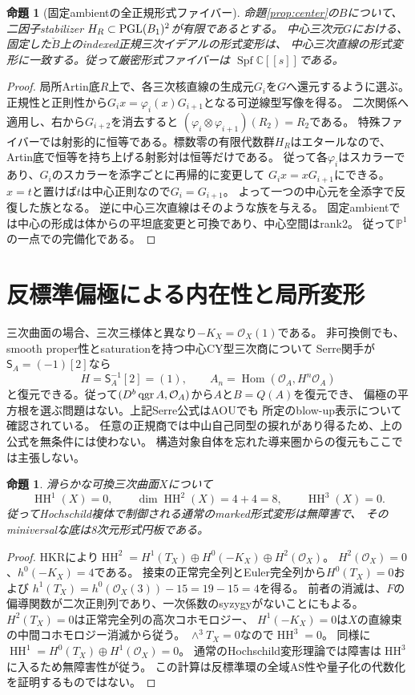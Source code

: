 \documentclass[11pt,a4paper]{ltjsarticle}
\newtheorem{proposition}[theorem]{命題}
\theoremstyle{definition}\newtheorem{remark}[theorem]{注意}
\newcommand{\PP}{\mathbb P}\newcommand{\kk}{\mathbb C}
\newcommand{\Hom}{\operatorname{Hom}}\newcommand{\HH}{\operatorname{HH}}
\newcommand{\OO}{\mathcal O}\newcommand{\rank}{\operatorname{rank}}
\begin{document}
\begin{proposition}[固定ambientの全正規形式ファイバー]\label{prop:normal}
命題\ref{prop:center}の$B$について、二因子stabilizer
$H_R\subset\operatorname{PGL}(B_1)^2$が有限であるとする。
中心三次元$G$における、固定した$\check B$上のindexed正規三次イデアルの形式変形は、
中心三次直線の形式変形に一致する。従って厳密形式ファイバーは
$\operatorname{Spf}\kk[[s]]$である。
\end{proposition}
\begin{proof}
局所Artin底$R$上で、各三次核直線の生成元$G_i$を$G$へ還元するように選ぶ。
正規性と正則性から$G_i x=\varphi_i(x)G_{i+1}$となる可逆線型写像を得る。
二次関係へ適用し、右から$G_{i+2}$を消去すると
$(\varphi_i\otimes\varphi_{i+1})(R_2)=R_2$である。
特殊ファイバーでは射影的に恒等である。標数零の有限代数群$H_R$はエタールなので、
Artin底で恒等を持ち上げる射影対は恒等だけである。
従って各$\varphi_i$はスカラーであり、$G_i$のスカラーを添字ごとに再帰的に変更して
$G_i x=xG_{i+1}$にできる。$x=t$と置けば$t$は中心正則なので$G_i=G_{i+1}$。
よって一つの中心元を全添字で反復した族となる。
逆に中心三次直線はそのような族を与える。
固定ambientでは中心の形成は体からの平坦底変更と可換であり、中心空間はrank2。
従って$\PP^1$の一点での完備化である。
\end{proof}

\section{反標準偏極による内在性と局所変形}
三次曲面の場合、三次三様体と異なり$-K_X=\OO_X(1)$である。
非可換側でも、smooth proper性とsaturationを持つ中心CY型三次商について
Serre関手が$\mathsf S_A=(-1)[2]$なら
\[
 H=\mathsf S_A^{-1}[2]=(1),\qquad
 A_n=\Hom(\OO_A,H^n\OO_A)
\]
と復元できる。従って$(D^b\qgr A,\OO_A)$から$A$と$B=Q(A)$を復元でき、
偏極の平方根を選ぶ問題はない。上記Serre公式はAOU\cite[Lemma 9.2]{AOU}でも
所定のblow-up表示について確認されている。
任意の正規商では中山自己同型の捩れがあり得るため、上の公式を無条件には使わない。
構造対象自体を忘れた導来圏からの復元もここでは主張しない。

\begin{proposition}\label{prop:hh}
滑らかな可換三次曲面$X$について
\[
 \HH^1(X)=0,\qquad \dim\HH^2(X)=4+4=8,\qquad \HH^3(X)=0.
\]
従ってHochschild複体で制御される通常のmarked形式変形は無障害で、
そのminiversalな底は8次元形式円板である。
\end{proposition}
\begin{proof}
HKRにより$\HH^2=H^1(T_X)\oplus H^0(-K_X)\oplus H^2(\OO_X)$。
$H^2(\OO_X)=0$、$h^0(-K_X)=4$である。
接束の正常完全列とEuler完全列から$H^0(T_X)=0$および
$h^1(T_X)=h^0(\OO_X(3))-15=19-15=4$を得る。
前者の消滅は、$F$の偏導関数が二次正則列であり、一次係数のsyzygyがないことにもよる。
$H^2(T_X)=0$は正常完全列の高次コホモロジー、
$H^1(-K_X)=0$は$X$の直線束の中間コホモロジー消滅から従う。
$\wedge^3T_X=0$なので$\HH^3=0$。
同様に$\HH^1=H^0(T_X)\oplus H^1(\OO_X)=0$。
通常のHochschild変形理論では障害は$\HH^3$に入るため無障害性が従う。
この計算は反標準環の全域AS性や量子化の代数化を証明するものではない。
\end{proof}
\end{document}
